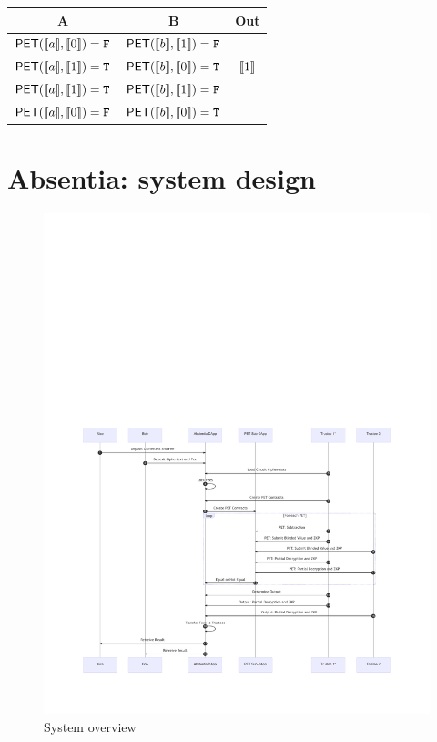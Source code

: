 \begin{center}
\begin{tabular}{|c|c|c|}
  \hline
  A			& 	B			& 	Out   			\\ \hline
  $\mathsf{PET}(\llbracket a \rrbracket,\llbracket 0 \rrbracket) = \mathtt{F}$ 	&	$\mathsf{PET}(\llbracket b \rrbracket,\llbracket 1 \rrbracket) = \mathtt{F}$ 	& 	 		\\ \hline
  $\mathsf{PET}(\llbracket a \rrbracket,\llbracket 1 \rrbracket) = \mathtt{T}$ 	&	$\mathsf{PET}(\llbracket b \rrbracket,\llbracket 0 \rrbracket) = \mathtt{T}$ 	&  $\llbracket 1 \rrbracket$  	\\ \hline
  $\mathsf{PET}(\llbracket a \rrbracket,\llbracket 1 \rrbracket) = \mathtt{T}$ 	&	$\mathsf{PET}(\llbracket b \rrbracket,\llbracket 1 \rrbracket) = \mathtt{F}$ 	&  	 		\\ \hline
  $\mathsf{PET}(\llbracket a \rrbracket,\llbracket 0 \rrbracket) = \mathtt{F}$ 	&	$\mathsf{PET}(\llbracket b \rrbracket,\llbracket 0 \rrbracket) = \mathtt{T}$ 	& 	 		\\ \hline
\end{tabular}
\end{center}


\section{Absentia: system design}
\label{sec:system}

\begin{figure}[t]
	\includegraphics[width=1\textwidth]{figures/absentia.pdf}
	\caption{System overview}
	\centering
	\label{fig:system}
\end{figure}

